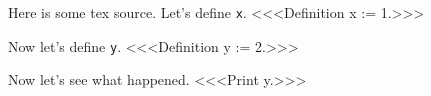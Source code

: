 Here is some tex source.  Let's define {\tt x}.
<<<Definition x := 1.>>>

Now let's define {\tt y}.
<<<Definition y := 2.>>>

Now let's see what happened.
<<<Print y.>>>

\bye
